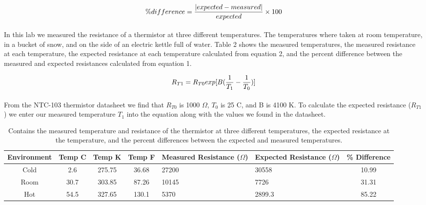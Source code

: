 \documentclass{article}
\begin{document}
\begin{equation}
	\% difference = {|expected - measured| \over expected} \times 100
\end{equation}

\paragraph{}
In this lab we measured the resistance of a thermistor at three different temperatures. The temperatures where taken at room temperature, in a bucket of snow, and on the side of an electric kettle full of water. Table 2 shows the measured temperatures, the measured resistance at each temperature, the expected resistance at each temperature calculated from equation 2, and the percent difference between the measured and expected resistances calculated from equation 1.

\begin{equation}
	R_{T1} = R_{T0}exp[B({1 \over T_1} - {1 \over T_0})]
\end{equation}

\paragraph{}
From the NTC-103 thermistor datasheet we find that $R_{T0}$ is 1000 $\Omega$, $T_0$ is 25 C, and B is 4100 K. To calculate the expected resistance ($R_{T1}$) we enter our measured temperature $T_1$ into the equation along with the values we found in the datasheet.

\begin{table}[H]
\begin{tabularx}{\textwidth}{ | c | c | c | c | X | X | c | }
	\hline
	\textbf{Environment} &
	\textbf{Temp C} &
	\textbf{Temp K} &
	\textbf{Temp F} &
	\textbf{Measured Resistance ($\Omega$)} &
	\textbf{Expected Resistance ($\Omega$)} &
	\textbf{\% Difference} \\
	\hline
	Cold & 2.6 & 275.75 & 36.68 & 27200 & 30558 & 10.99 \\
	\hline
	Room & 30.7 & 303.85 & 87.26 & 10145 & 7726 & 31.31 \\
	\hline
	Hot & 54.5 & 327.65 & 130.1 & 5370 & 2899.3 & 85.22 \\
	\hline
\end{tabularx}
\caption{\label{tab:table-name}Contains the measured temperature and resistance of the thermistor at three different temperatures, the expected resistance at the temperature, and the percent differences between the expected and measured temperatures.}
\end{table}
\end{document}

